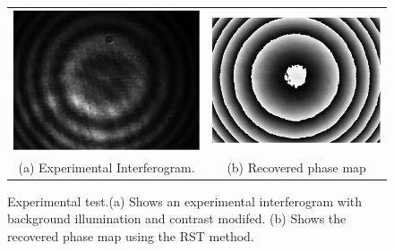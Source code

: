\documentclass[letterpaper,12pt]{article}   %
\begin{document}
\begin{figure}[h t]
	\begin{center}
		\begin{tabular}{c c}
			\includegraphics[scale=0.35]{figures/InterferogramaExpMod.png}}&
			\includegraphics[scale=0.35]{figures/faseExpRST.png}}& \\
			(a) Experimental Interferogram. & (b) Recovered phase map
		\end{tabular}
	\end{center}
	\caption{Experimental test.(a) Shows an experimental interferogram with background illumination and contrast modifed. (b) Shows the recovered phase map using the RST method.}
	\label{fig:ExpPhase}
\end{figure}
\end{document}
